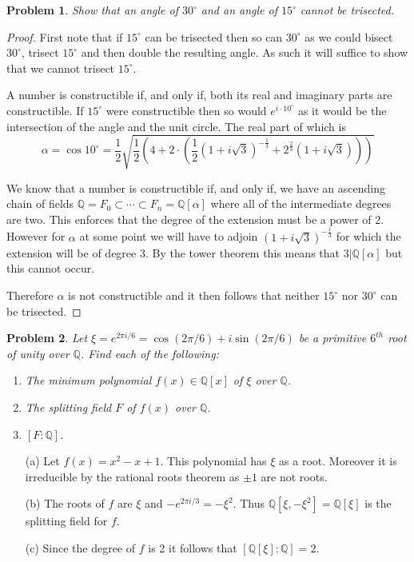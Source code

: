 \documentclass[10pt]{article}
\newcommand{\sk}{\vskip 10mm}
\newcommand{\bb}[1]{\mathbb{#1}}
\theoremstyle{plain}
\newtheorem{problem}{Problem}
\theoremstyle{remark}
\begin{document}
\begin{problem}
  Show that an angle of $30^\circ$ and an angle of $15^\circ$ cannot be trisected.
\end{problem}

\begin{proof}
  First note that if $15^\circ$ can be trisected then so can $30^\circ$ as we could bisect
  $30^\circ$, trisect $15^\circ$ and then double the resulting angle. As such it will
  suffice to show that we cannot trisect $15^\circ$.

  A number is constructible if, and only if, both its real and imaginary parts are
  constructible. If $15^\circ$ were constructible then so would $e^{i\cdot 10^\circ}$ as it would
  be the intersection of the angle and the unit circle. The real part of which is
  \[\alpha=\cos10^\circ = \frac{1}{2}\sqrt{\frac{1}{2}\left(4+2\cdot\left(\frac{1}{2}(1+i\sqrt{3})^{-\frac{1}{3}}+2^{\frac{2}{3}}(1+i\sqrt{3})\right)\right)} \]

  We know that a number is constructible if, and only if, we have an ascending
  chain of fields $\bb{Q}=F_0\subset\cdots\subset F_n=\bb{Q}[\alpha]$ where all of the intermediate degrees are two.
  This enforces that the degree of the extension must be a power of $2$. However
  for $\alpha$ at some point we will have to adjoin $(1+i\sqrt{3})^{-\frac{1}{3}}$ for which the
  extension will be of degree $3$. By the tower theorem this means that $3|\bb{Q}[\alpha]$ but
  this cannot occur.

  Therefore $\alpha$ is not constructible and it then follows that neither $15^\circ$ nor $30^\circ$ can
  be trisected.
\end{proof}

\sk

\begin{problem}
  Let $\xi = e^{2\pi i /6} = \cos (2\pi/6) + i \sin (2\pi/6)$ be a primitive
  $6^{th}$ root of unity over $\mathbb{Q}$. Find each of the following:
\begin{enumerate}
    \item The minimum polynomial $f(x) \in \mathbb{Q}[x]$ of $\xi$ over $\mathbb{Q}$.
    \item The splitting field $F$ of $f(x)$ over $\mathbb{Q}$.
    \item $[F:\mathbb{Q}]$.
\end{enumerate}
\end{problem}

\begin{itemize}
\item[(a)]
  Let $f(x)=x^2-x+1$. This polynomial has $\xi$ as a root. Moreover it is irreducible by
  the rational roots theorem as $\pm 1$ are not roots.
\item[(b)]
  The roots of $f$ are $\xi$ and $-e^{2\pi i/3}=-\xi^2$. Thus $\bb{Q}[\xi,-\xi^2]=\bb{Q}[\xi]$ is the
  splitting field for $f$.
\item[(c)]
  Since the degree of $f$ is 2 it follows that $[\bb{Q}[\xi]:\bb{Q}]=2$.
\end{itemize}
\end{document}
